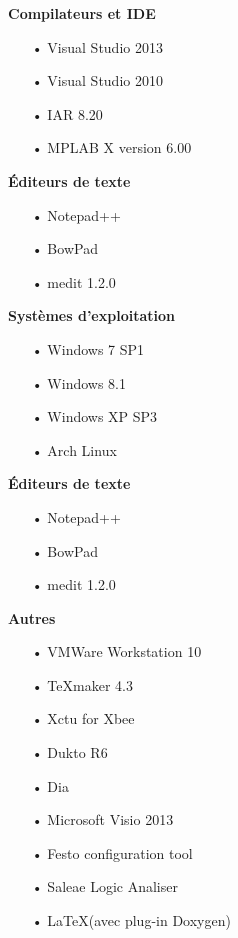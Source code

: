 \documentclass[10pt,a4paper,final]{article}
\begin{document}
\begin{spacing}{1.5}
\begin{flushleft}
\begin{multicols}{3}
\textbf{Compilateurs et IDE}
\begin{itemize}
\item[•]Visual Studio 2013
\item[•]Visual Studio 2010
\item[•]IAR 8.20
\item[•]MPLAB X version 6.00
\end{itemize}

\textbf{Éditeurs de texte}
\begin{itemize}
\item[•]Notepad++
\item[•]BowPad
\item[•]medit 1.2.0
\end{itemize}

\textbf{Systèmes d'exploitation}
\begin{itemize}
\item[•]Windows 7 SP1
\item[•]Windows 8.1
\item[•]Windows XP SP3

\item[•]Arch Linux
\end{itemize}

\textbf{Éditeurs de texte}
\begin{itemize}
\item[•]Notepad++
\item[•]BowPad
\item[•]medit 1.2.0
\end{itemize}

\textbf{Autres}
\begin{itemize}
\item[•]VMWare Workstation 10
\item[•]TeXmaker 4.3
\item[•]Xctu for Xbee
\item[•]Dukto R6
\item[•]Dia
\item[•]Microsoft Visio 2013
\item[•]Festo configuration tool
\item[•]Saleae Logic Analiser
\item[•]\LaTeX (avec plug-in Doxygen)
\end{itemize}

\end{multicols}
\end{flushleft}
\begin{flushleft}
\HRule
\end{flushleft}


\end{spacing}
\end{document}
